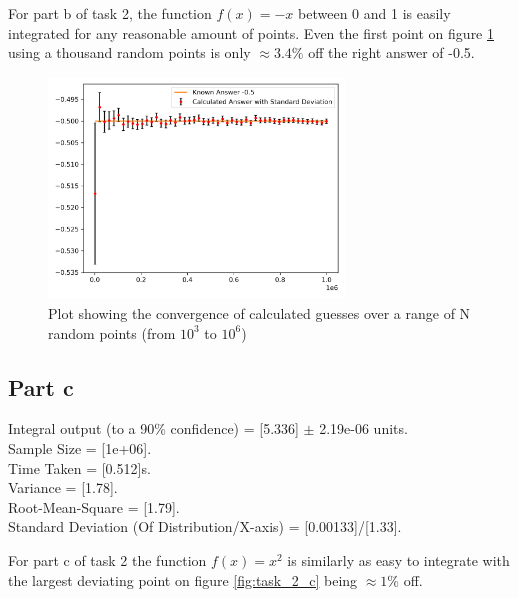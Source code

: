 \documentclass[12pt, A4]{article}
\begin{document}
\vspace{1em}

For part b of task 2, the function $f(x)=-x$ between 0 and 1 is easily 
integrated for any reasonable amount of points. Even the first point 
on figure \ref{fig:task_2_b} using a thousand random points is only 
$\approx 3.4\%$ off the right answer of -0.5.

\begin{figure}[H]
  \begin{center}
    \includegraphics[width=0.7\textwidth]{task_2_b.png}
  \end{center}
  \caption{Plot showing the convergence of calculated guesses over a range of N random points (from $10^3$ to $10^6$)}
  \label{fig:task_2_b}
\end{figure}



\subsection{Part c} %
\label{sub:Part c}


Integral output (to a 90\% confidence) = [5.336] $\pm$  2.19e-06 units.
\\
Sample Size = [1e+06].
\\
Time Taken = [0.512]s.
\\
Variance = [1.78].
\\
Root-Mean-Square = [1.79].
\\
Standard Deviation (Of Distribution/X-axis) = [0.00133]/[1.33].

\vspace{1em}

For part c of task 2 the function $f(x)=x^2$ is similarly as easy to 
integrate with the largest deviating point on figure \ref{fig:task_2_c} 
being $\approx 1\%$ off.
\end{document}
